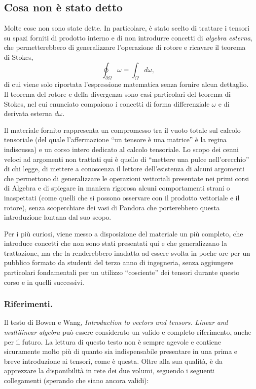 \subsection{Cosa non è stato detto}
 Molte cose non sono state dette. In particolare, è stato scelto di trattare i tensori su spazi forniti di prodotto interno e di non introdurre concetti di \textit{algebra esterna}, che permetterebbero di generalizzare l'operazione di rotore e ricavare il teorema di Stokes,
\begin{equation}
 \oint_{\partial \Omega} \omega = \int_\Omega d\omega ,
\end{equation}
 di cui viene solo riportata l'espressione matematica senza fornire alcun dettaglio. Il teorema del rotore e della divergenza sono casi particolari del teorema di Stokes, nel cui enunciato compaiono i concetti di forma differenziale $\omega$ e di derivata esterna $d \omega$.

 \noindent
Il materiale fornito rappresenta un compromesso tra il vuoto totale sul calcolo tensoriale (del quale l'affermazione ``un tensore è una matrice'' è la regina indiscussa) e un corso intero dedicato al calcolo tensoriale. Lo scopo dei cenni veloci ad argomenti non trattati qui è quello di ``mettere una pulce nell'orecchio'' di chi legge, di mettere a conoscenza il lettore dell'esistenza di alcuni argomenti che permettono di generalizzare le operazioni vettoriali presentate nei primi corsi di Algebra e di spiegare in maniera rigorosa alcuni comportamenti strani o inaspettati (come quelli che si possono osservare con il prodotto vettoriale e il rotore), senza scoperchiare dei vasi di Pandora che porterebbero questa introduzione lontana dal suo scopo.

\vspace{10pt}
 \noindent
 Per i più curiosi, viene messo a disposizione del materiale un più completo, che introduce concetti che non sono stati presentati qui e che generalizzano la trattazione, ma che la renderebbero inadatta ad essere svolta in poche ore per un pubblico formato da studenti del terzo anno di ingegneria, senza aggiungere particolari fondamentali per un utilizzo ``cosciente'' dei tensori durante questo corso e in quelli successivi.

 \subsubsection{Riferimenti.}  
 Il testo di Bowen e Wang, \textit{Introduction to vectors and tensors. Linear and multilinear algebra} può essere considerato un valido e completo riferimento, anche per il futuro. La lettura di questo testo non è sempre agevole e contiene sicuramente molto più di quanto sia indispensabile presentare in una prima e breve introduzione ai tensori, come è questa.
 Oltre alla sua qualità, è da apprezzare la disponibilità in rete dei due volumi, seguendo i seguenti collegamenti (sperando che siano ancora validi):
 
